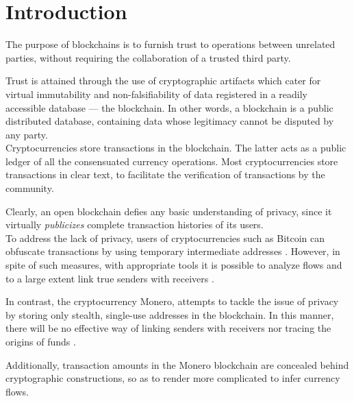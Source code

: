 

\chapter{Introduction}
\label{chap:introduction}

The purpose of blockchains is to furnish trust to operations between unrelated parties, without requiring the collaboration of a trusted third party.

Trust is attained through the use of cryptographic artifacts which cater for virtual immutability and non-falsifiability of data registered in a readily accessible database --- the blockchain.
In other words, a blockchain is a public distributed database, containing data whose legitimacy cannot 
be disputed by any party.
\\

Cryptocurrencies store transactions in the blockchain. The latter acts as a public ledger of all the consensuated currency operations. Most cryptocurrencies store transactions in clear text, to facilitate the verification of transactions by the community.

Clearly, an open blockchain defies any basic understanding of privacy, since it virtually 
{\em publicizes} complete transaction histories of its users. 
\\

To address the lack of privacy, users of cryptocurrencies such as Bitcoin can obfuscate transactions by using temporary intermediate addresses \cite{DBLP:journals/corr/NarayananM17}. However, in spite of such measures, with appropriate tools it is possible to analyze flows and to a large extent 
link true senders with receivers \cite{DBLP:journals/corr/ShenTuY15b, DK-police-tracing-btc, Andrew-Cox-Sandia}.

In contrast, the cryptocurrency Monero, attempts to tackle the issue of privacy by storing only stealth, single-use addresses in the blockchain. In this manner, there will be no effective way of linking senders with receivers nor tracing the origins of funds \cite{Monero-intro}.

Additionally, transaction amounts in the Monero blockchain are concealed behind cryptographic constructions, so as to render more complicated to infer currency flows.

